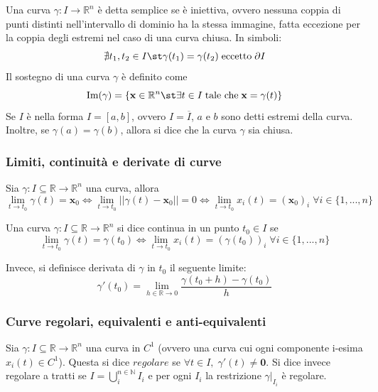         Una curva $\gamma: I \rightarrow \mathbb{R}^{n}$ è detta semplice se è iniettiva, ovvero nessuna coppia di punti distinti nell'intervallo di dominio ha la stessa immagine, fatta eccezione per la coppia degli estremi nel caso di una curva chiusa. In simboli:
        \[
            \nexists t_1, t_2 \in I \st \gamma(t_1) = \gamma(t_2) \; \textnormal{eccetto} \; \partial I
        \]
        Il sostegno di una curva $\gamma$ è definito come
        \[
            \textnormal{Im}(\gamma) = \{ \mathbf{x} \in \mathbb{R}^{n} \st \exists t \in I \; \textnormal{tale che} \; \mathbf{x} = \gamma(t)\}
        \]
        Se $I$ è nella forma $I = [a, b]$, ovvero $I = \overline{I}$, $a$ e $b$ sono detti estremi della curva. Inoltre, se $\gamma(a) = \gamma(b)$, allora si dice che la curva $\gamma$ sia chiusa.

        \subsubsection{Limiti, continuità e derivate di curve}
            Sia $\gamma: I \subseteq \mathbb{R} \rightarrow \mathbb{R}^{n}$ una curva, allora
            \[
                \lim_{t \rightarrow t_0} \gamma(t) = \mathbf{x}_0 \iff \lim_{t \rightarrow t_0} ||\gamma(t) - \mathbf{x}_0|| = 0 \iff \lim_{t \rightarrow t_0} x_i(t) = (\mathbf{x}_0)_i \; \forall i \in \{1, ..., n\}
            \]

            Una curva $\gamma: I \subseteq \mathbb{R} \rightarrow \mathbb{R}^{n}$ si dice continua in un punto $t_0 \in I$ se
            \[
                \lim_{t \rightarrow t_0} \gamma(t) = \gamma(t_0) \iff \lim_{t \rightarrow t_0} x_i(t) = (\gamma(t_0))_i \; \forall i \in \{1, ..., n\}
            \]

            Invece, si definisce derivata di $\gamma$ in $t_0$ il seguente limite:
            \[
                \gamma'(t_0) = \lim_{h \in \mathbb{R} \rightarrow 0} \frac{\gamma(t_0 + h) - \gamma(t_0)}{h}
            \]

        \subsubsection{Curve regolari, equivalenti e anti-equivalenti}
            Sia $\gamma: I \subseteq \mathbb{R} \rightarrow \mathbb{R}^{n}$ una curva in $C^{1}$ (ovvero una curva cui ogni componente i-esima $x_i(t) \in C^1$). Questa si dice $\textit{regolare}$ se $\forall t \in I, \; \gamma'(t) \neq \mathbf{0}$.
            Si dice invece regolare a tratti se $I = \bigcup_{i}^{n \in \mathbb{N}} I_{i}$ e per ogni $I_{i}$ la restrizione $\gamma|_{I_{i}}$ è regolare.

